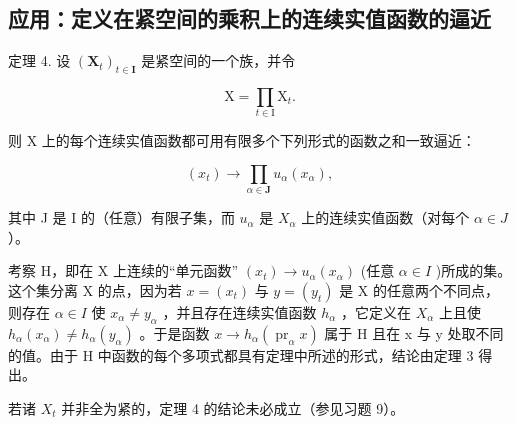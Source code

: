 \subsection{应用：定义在紧空间的乘积上的连续实值函数的逼近}

定理 4. 设 \((\mathbf{X}_t)_{t\in \mathbf{I}}\) 是紧空间的一个族，并令

\[
\mathrm{X} = \prod_ {t \in \mathrm{I}} \mathrm{X} _ {t}.
\]

则 X 上的每个连续实值函数都可用有限多个下列形式的函数之和一致逼近：

\[
(x _ {t}) \rightarrow \prod_ {\alpha \in \mathbf {J}} u _ {\alpha} (x _ {\alpha}),
\]

其中 J 是 I 的（任意）有限子集，而 \(u_{\alpha}\) 是 \(X_{\alpha}\) 上的连续实值函数（对每个 \(\alpha \in J\) ）。

考察 H，即在 X 上连续的“单元函数” \((x_{t}) \rightarrow u_{\alpha}(x_{\alpha})\) (任意 \(\alpha \in I\) )所成的集。这个集分离 X 的点，因为若 \(x = (x_{t})\) 与 \(y = (y_{t})\) 是 X 的任意两个不同点，则存在 \(\alpha \in I\) 使 \(x_{\alpha} \neq y_{\alpha}\) ，并且存在连续实值函数 \(h_{\alpha}\) ，它定义在 \(X_{\alpha}\) 上且使 \(h_{\alpha}(x_{\alpha}) \neq h_{\alpha}(y_{\alpha})\) 。于是函数 \(x \rightarrow h_{\alpha}(\operatorname{pr}_{\alpha} x)\) 属于 H 且在 x 与 y 处取不同的值。由于 H 中函数的每个多项式都具有定理中所述的形式，结论由定理 3 得出。

若诸 \(X_{t}\) 并非全为紧的，定理 4 的结论未必成立（参见习题 9）。

